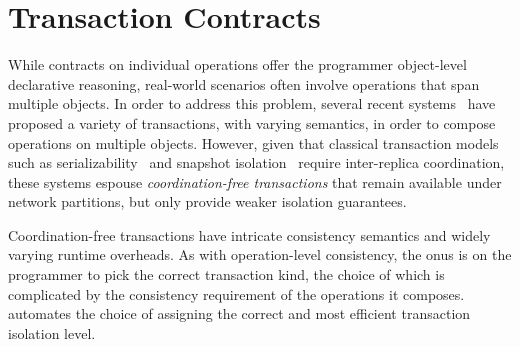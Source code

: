 \section{Transaction Contracts}

While contracts on individual operations offer the programmer object-level
declarative reasoning, real-world scenarios often involve operations that span
multiple objects. In order to address this problem, several recent
systems~\cite{COPS,BurckhardtESOP,BailisHAT} have proposed a variety of
transactions, with varying semantics, in order to compose operations on
multiple objects. However, given that classical transaction models such as
serializability~\cite{} and snapshot isolation~\cite{} require inter-replica
coordination, these systems espouse \emph{coordination-free transactions} that
remain available under network partitions, but only provide weaker isolation
guarantees.

Coordination-free transactions have intricate consistency semantics and widely
varying runtime overheads. As with operation-level consistency, the onus is on
the programmer to pick the correct transaction kind, the choice of which is
complicated by the consistency requirement of the operations it composes. \name
automates the choice of assigning the correct and most efficient transaction
isolation level.
